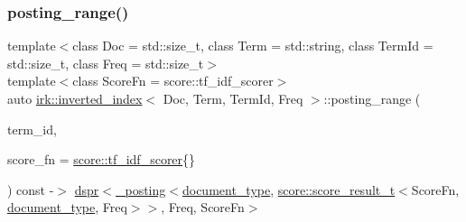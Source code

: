 \subsubsection{\texorpdfstring{posting\+\_\+range()}{posting\_range()}\hspace{0.1cm}{\footnotesize\ttfamily [2/2]}}
{\footnotesize\ttfamily template$<$class Doc  = std\+::size\+\_\+t, class Term  = std\+::string, class Term\+Id  = std\+::size\+\_\+t, class Freq  = std\+::size\+\_\+t$>$ \\
template$<$class Score\+Fn  = score\+::tf\+\_\+idf\+\_\+scorer$>$ \\
auto \mbox{\hyperlink{classirk_1_1inverted__index}{irk\+::inverted\+\_\+index}}$<$ Doc, Term, Term\+Id, Freq $>$\+::posting\+\_\+range (\begin{DoxyParamCaption}\item[{\mbox{\hyperlink{classirk_1_1inverted__index_aac7579f5261c795a6f19a7f700b57b2b}{term\+\_\+id\+\_\+type}}}]{term\+\_\+id,  }\item[{Score\+Fn}]{score\+\_\+fn = {\ttfamily \mbox{\hyperlink{structirk_1_1score_1_1tf__idf__scorer}{score\+::tf\+\_\+idf\+\_\+scorer}}\{\}} }\end{DoxyParamCaption}) const -\/$>$ \mbox{\hyperlink{namespaceirk_af92c7aae439f59ccae252f027f851c24}{dspr}}$<$\mbox{\hyperlink{structirk_1_1__posting}{\+\_\+posting}}$<$\mbox{\hyperlink{classirk_1_1inverted__index_ab708a9d1605de705341f3ed81bd7d5e7}{document\+\_\+type}},
                    \mbox{\hyperlink{namespaceirk_1_1score_af4a2c84b3548a4ac12aac3862bc94875}{score\+::score\+\_\+result\+\_\+t}}$<$Score\+Fn, \mbox{\hyperlink{classirk_1_1inverted__index_ab708a9d1605de705341f3ed81bd7d5e7}{document\+\_\+type}}, Freq$>$$>$,
            Freq,
            Score\+Fn$>$
    \hspace{0.3cm}{\ttfamily [inline]}}

\mbox{\label{classirk_1_1inverted__index_ada3586a485b42d220669d319f6b5acc4}} 
